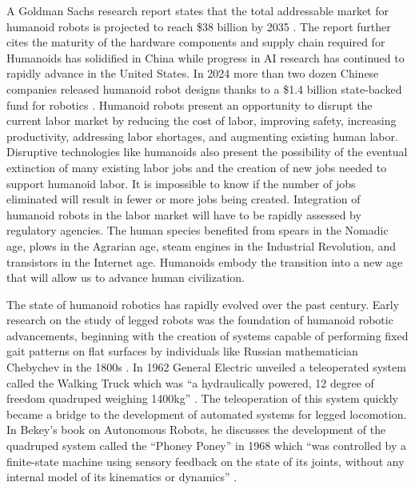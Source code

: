 \documentclass{article}
\begin{document}
A Goldman Sachs research report states that the total addressable market for humanoid robots is projected to reach \$38 billion by 2035 \cite{goldmansachs2024}. The report further cites the maturity of the hardware components and supply chain required for Humanoids has solidified in China while progress in AI research has continued to rapidly advance in the United States. In 2024 more than two dozen Chinese companies released humanoid robot designs thanks to a \$1.4 billion state-backed fund for robotics \cite{li2024}. Humanoid robots present an opportunity to disrupt the current labor market by reducing the cost of labor, improving safety, increasing productivity, addressing labor shortages, and augmenting existing human labor. Disruptive technologies like humanoids also present the possibility of the eventual extinction of many existing labor jobs and the creation of new jobs needed to support humanoid labor. It is impossible to know if the number of jobs eliminated will result in fewer or more jobs being created. Integration of humanoid robots in the labor market will have to be rapidly assessed by regulatory agencies. The human species benefited from spears in the Nomadic age, plows in the Agrarian age, steam engines in the Industrial Revolution, and transistors in the Internet age. Humanoids embody the transition into a new age that will allow us to advance human civilization. 

The state of humanoid robotics has rapidly evolved over the past century. Early research on the study of legged robots was the foundation of humanoid robotic advancements, beginning with the creation of systems capable of performing fixed gait patterns on flat surfaces by individuals like Russian mathematician Chebychev in the 1800s \cite{kim2017}.  In 1962 General Electric unveiled a teleoperated system called the Walking Truck which was “a hydraulically powered, 12 degree of freedom quadruped weighing 1400kg” \cite{kim2017}. The teleoperation of this system quickly became a bridge to the development of automated systems for legged locomotion. In Bekey’s book on Autonomous Robots, he discusses the development of the quadruped system called the “Phoney Poney” in 1968 which “was controlled by a finite-state machine using sensory feedback on the state of its joints, without any internal model of its kinematics or dynamics” \cite{bekey2005}. 
\end{document}
